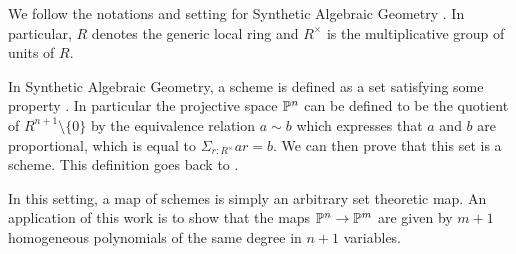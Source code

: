 We follow the notations and setting for Synthetic Algebraic Geometry \cite{draft}.
In particular, $R$ denotes the generic local ring and $R^\times$ is the multiplicative group of units of $R$.

In Synthetic Algebraic Geometry, a scheme is defined as a set satisfying some property \cite{draft}. In particular
the projective space $\mathbb{P}^n$ can be defined to be the quotient of $R^{n+1}\setminus\{0\}$ by the
equivalence relation $a\sim b$ which expresses that $a$ and $b$ are proportional, %
which is equal to $\Sigma_{r:R^\times}ar = b$. We can then prove \cite{draft}
that this set is a scheme. This definition goes back to \cite{Kock74}.

 In this setting, a map of schemes is simply an arbitrary set theoretic map. An application of this work is to show
 that the maps $\mathbb{P}^n\rightarrow \mathbb{P}^m$ are given by $m+1$ homogeneous polynomials of the same degree in $n+1$ variables.

\medskip



